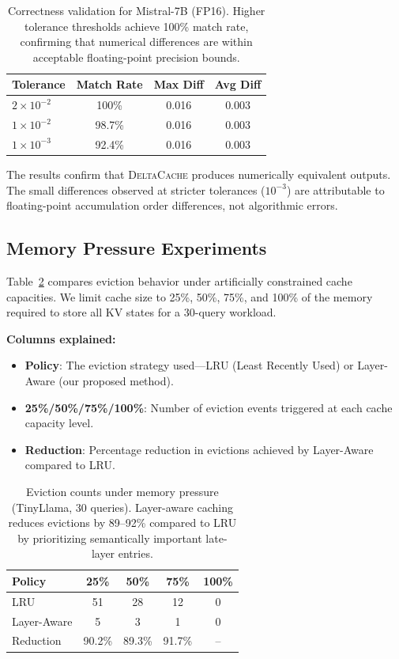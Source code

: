 \documentclass{article}
\newcommand{\deltacache}{\textsc{DeltaCache}}
\begin{document}
\begin{table}[h]
\centering
\caption{Correctness validation for Mistral-7B (FP16). Higher tolerance thresholds achieve 100\% match rate, confirming that numerical differences are within acceptable floating-point precision bounds.}
\label{tab:correctness_full}
\begin{tabular}{lccc}
\toprule
Tolerance & Match Rate & Max Diff & Avg Diff \\
\midrule
$2 \times 10^{-2}$ & 100\% & 0.016 & 0.003 \\
$1 \times 10^{-2}$ & 98.7\% & 0.016 & 0.003 \\
$1 \times 10^{-3}$ & 92.4\% & 0.016 & 0.003 \\
\bottomrule
\end{tabular}
\end{table}

The results confirm that \deltacache{} produces numerically equivalent outputs. The small differences observed at stricter tolerances ($10^{-3}$) are attributable to floating-point accumulation order differences, not algorithmic errors.

\subsection{Memory Pressure Experiments}

Table~\ref{tab:pressure_full} compares eviction behavior under artificially constrained cache capacities.
We limit cache size to 25\%, 50\%, 75\%, and 100\% of the memory required to store all KV states for a 30-query workload.

\textbf{Columns explained:}
\begin{itemize}
    \item \textbf{Policy}: The eviction strategy used---LRU (Least Recently Used) or Layer-Aware (our proposed method).
    \item \textbf{25\%/50\%/75\%/100\%}: Number of eviction events triggered at each cache capacity level.
    \item \textbf{Reduction}: Percentage reduction in evictions achieved by Layer-Aware compared to LRU.
\end{itemize}

\begin{table}[h]
\centering
\caption{Eviction counts under memory pressure (TinyLlama, 30 queries). Layer-aware caching reduces evictions by 89--92\% compared to LRU by prioritizing semantically important late-layer entries.}
\label{tab:pressure_full}
\begin{tabular}{lcccc}
\toprule
Policy & 25\% & 50\% & 75\% & 100\% \\
\midrule
LRU & 51 & 28 & 12 & 0 \\
Layer-Aware & 5 & 3 & 1 & 0 \\
\midrule
Reduction & 90.2\% & 89.3\% & 91.7\% & -- \\
\bottomrule
\end{tabular}
\end{table}
\end{document}
